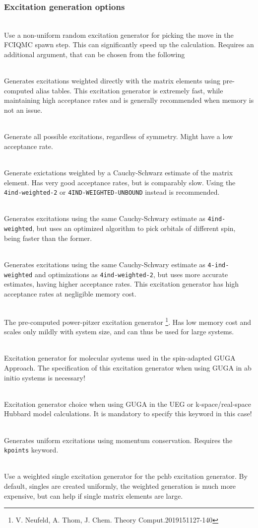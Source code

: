 \documentclass[a4paper,notitlepage,dvipsnames]{scrreprt}
\newcommand\codeitem[1]{\needspace{1.5\baselineskip}\item[\textnormal{\ttfamily #1 \nopagebreak}] \hfill \\ \nopagebreak}
\begin{document}
\subsubsection{Excitation generation options}
\begin{description}
  \codeitem{\textcolor{oblue}{nonUniformRandExcits}}
  Use a non-uniform random excitation generator for picking the move in the
  FCIQMC spawn step. This can significantly speed up the calculation. Requires an additional
  argument, that can be chosen from the following
  \begin{description}
   \codeitem{\textcolor{oblue}{pchb}}
    Generates excitations weighted directly with the matrix elements using pre-computed
    alias tables. This excitation generator is extremely fast, while
    maintaining high acceptance rates and is generally recommended when
    memory is not an issue.
    \codeitem{nosymgen}
    Generate all possible excitations, regardless of symmetry. Might have a
    low acceptance rate.
    \codeitem{4ind-weighted}
    Generate exictations weighted by a Cauchy-Schwarz estimate of the matrix
    element. Has very good acceptance rates, but is comparably slow. Using the
    \texttt{4ind-weighted-2} or \texttt{4IND-WEIGHTED-UNBOUND} instead is recommended.
    \codeitem{4ind-weighted-2}
    Generates excitations using the same Cauchy-Schwary estimate as
    \texttt{4ind-weighted}, but uses an optimized algorithm to pick orbitals
    of different spin, being faster than the former.
    \codeitem{4ind-weighted-unbound}
    Generates excitations using the same Cauchy-Schwary estimate as
    \texttt{4-ind-weighted} and optimizations as \texttt{4ind-weighted-2}, but
    uses more accurate estimates, having higher acceptance rates. This
    excitation generator has high acceptance rates at negligible memory cost.
    \codeitem{pcpp}
    The pre-computed power-pitzer excitation generator \footnote{V. Neufeld,
      A. Thom, J. Chem. Theory Comput.2019151127-140}. Has low memory cost and
    scales only mildly with system size, and can thus be used for large systems.
    \codeitem{mol-guga-weighted}
    Excitation generator for molecular systems used in the spin-adapted GUGA Approach. The specification of this excitation generator when using GUGA in ab initio systems is necessary!
    \codeitem{ueg-guga}
    Excitation generator choice when using GUGA in the UEG or k-space/real-space Hubbard model calculations. It is mandatory to specify this keyword in this case!

  \end{description}
  \codeitem{lattice-excitgen}
  Generates uniform excitations using momentum conservation. Requires the
  \texttt{kpoints} keyword.
  \codeitem{pchb-weighted-singles}
  Use a weighted single excitation generator for the pchb excitation
  generator. By default, singles are created uniformly, the weighted
  generation is much more expensive, but can help if single matrix elements
  are large.
\end{description}
\end{document}
